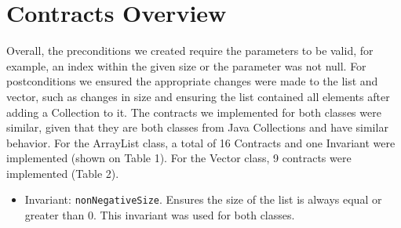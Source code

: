 \documentclass[a4paper]{article}
\begin{document}
\section{Contracts Overview}

Overall, the preconditions we created require the parameters to be valid, for example, an index within the given size or the parameter was not null. For postconditions we ensured the appropriate changes were made to the list and vector, such as changes in size and ensuring the list contained all elements after adding a Collection to it.
The contracts we implemented for both classes were similar, given that they are both classes from Java Collections and have similar behavior. 
For the ArrayList class, a total of 16 Contracts and one Invariant were implemented (shown on Table 1). For the Vector class, 9 contracts were implemented (Table 2). 
\begin{itemize}
 \item Invariant: \lstinline{nonNegativeSize}. Ensures the size of the list is always equal or greater than 0. This invariant was used for both classes.
\end{itemize}
\end{document}
